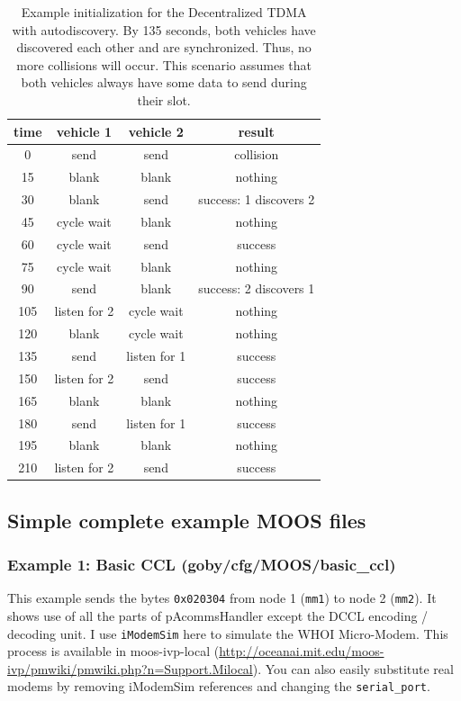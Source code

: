 \documentclass[11pt, letterpaper, oneside]{memoir}
\begin{document}
\begin{table}
\centering
\begin{tabular}{|c|c|c|c|}
\hline time & vehicle 1 & vehicle 2 & result \\ 
\hline 0   & send       & send  & collision \\ 
\hline 15  & blank      & blank & nothing \\ 
\hline 30  & blank      & send  & success: 1 discovers 2 \\ 
\hline 45  & cycle wait & blank & nothing \\ 
\hline 60  & cycle wait & send  & success \\ 
\hline 75  & cycle wait & blank & nothing \\ 
\hline 90  & send       & blank & success: 2 discovers 1 \\ 
\hline 105 & listen for 2 & cycle wait & nothing \\ 
\hline 120 & blank & cycle wait & nothing \\ 
\hline 135 & send & listen for 1 & success \\ 
\hline 150 & listen for 2 & send & success \\ 
\hline 165 & blank & blank & nothing \\ 
\hline 180 & send & listen for 1 & success \\ 
\hline 195 & blank & blank & nothing \\ 
\hline 210 & listen for 2 & send & success \\ 
\hline 
\end{tabular} 
\caption{Example initialization for the Decentralized TDMA with autodiscovery. By 135 seconds, both vehicles have discovered each other and are synchronized. Thus, no more collisions will occur. This scenario assumes that both vehicles always have some data to send during their slot.}
\end{table}

\subsection{Simple complete example MOOS files}

\subsubsection{Example 1: Basic CCL (goby/cfg/MOOS/basic\_ccl)}
This example sends the bytes \verb|0x020304| from node 1 (\verb|mm1|) to node 2 (\verb|mm2|). It shows use of all the parts of pAcommsHandler except the DCCL encoding / decoding unit. I use \verb|iModemSim| here to simulate the WHOI Micro-Modem. This process is available in moos-ivp-local (\url{http://oceanai.mit.edu/moos-ivp/pmwiki/pmwiki.php?n=Support.Milocal}). You can also easily substitute real modems by removing iModemSim references and changing the \verb|serial_port|.
\end{document}
